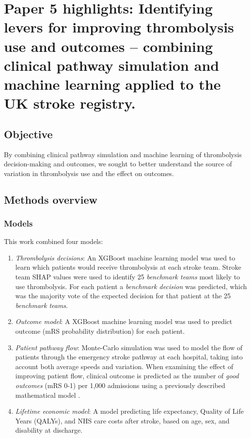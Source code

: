 \section{Paper 5 highlights: Identifying levers for improving thrombolysis use and outcomes – combining clinical pathway simulation and machine learning applied to the UK stroke registry.\cite{pearn_identifying_2024}} \label{sec:paper_5}

\subsection{Objective}

By combining clinical pathway simulation and machine learning of thrombolysis decision-making and outcomes, we sought to better understand the source of variation in thrombolysis use and the effect on outcomes.

\subsection{Methods overview}

\subsubsection{Models}

This work combined four models:

\begin{enumerate}

    \item \textit{Thrombolysis decisions}: An XGBoost machine learning model \cite{chen_xgboost_2016} was used to learn which patients would receive thrombolysis at each stroke team. Stroke team SHAP values were used to identify 25 \textit{benchmark teams} most likely to use thrombolysis. For each patient a \textit{benchmark decision} was predicted, which was the majority vote of the expected decision for that patient at the 25 \textit{benchmark teams}.

    \item \textit{Outcome model}: A XGBoost machine learning model was used to predict outcome (mRS probability distribution) for each patient.

    \item \textit{Patient pathway flow}: Monte-Carlo simulation was used to model the flow of patients through the emergency stroke pathway at each hospital, taking into account both average speeds and variation. When examining the effect of improving patient flow, clinical outcome is predicted as the number of \textit{good outcomes} (mRS 0-1) per 1,000 admissions using a previously described mathematical model \cite{allen_estimation_2020}.

    \item \textit{Lifetime economic model}: A model predicting life expectancy, Quality of Life Years (QALYs), and NHS care costs after stroke, based on age, sex, and disability at discharge\cite{mcmeekin_lifetime_2024}.
    
\end{enumerate}

